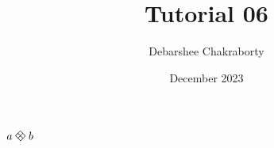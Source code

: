 \documentclass{article}
\title{Tutorial 06}
\author{Debarshee Chakraborty}
\date{December 2023}
\DeclareRobustCommand{\dimondtimes}{%
    \mathbin{\text{\rotatebox[origin=c]{45}{$\boxplus$}}}%
}
\begin{document}
\maketitle

$a\dimondtimes b$
\end{document}
